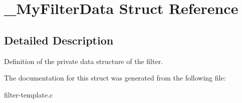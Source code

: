 \section{\-\_\-\-My\-Filter\-Data Struct Reference}
\label{struct__MyFilterData}


\subsection{Detailed Description}
Definition of the private data structure of the filter. 

The documentation for this struct was generated from the following file\-:\begin{DoxyCompactItemize}
\item 
filter-\/template.\-c\end{DoxyCompactItemize}
